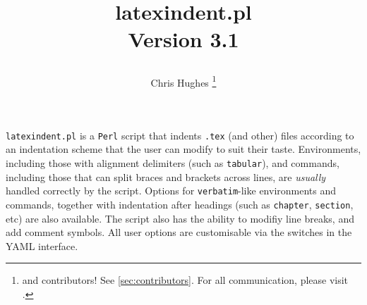 \documentclass[10pt]{article}
\begin{document}
\renewcommand*{\thefootnote}{\arabic{footnote}}
\title{%
	\begin{tcolorbox}[
			width=5.2cm,
			boxrule=0pt,
			colframe=white!40!black,
			colback=white,
			rightrule=2pt,
			sharp corners,
			enhanced,
			overlay={\node[anchor=north east,outer sep=2pt] at ([xshift=3cm,yshift=4mm]frame.north east) {\texttt{[image: logo]}}; }]
		\centering\ttfamily\bfseries latexindent.pl\\[1cm] Version 3.1
	\end{tcolorbox}
}
\author{Chris Hughes \thanks{and contributors! See \vref{sec:contributors}. For
		all communication, please visit \cite{latexindent-home}.}}
\maketitle
\begin{adjustwidth}{1cm}{1cm}
	\small
	\texttt{latexindent.pl} is a \texttt{Perl} script that indents \texttt{.tex} (and other)
	files according to an indentation scheme that the user can modify to suit their
	taste. Environments, including those with alignment delimiters (such as \texttt{tabular}),
	and commands, including those that can split braces and brackets across lines,
	are \emph{usually} handled correctly by the script. Options for \texttt{verbatim}-like
	environments and commands, together with indentation after headings (such as \lstinline!chapter!, \lstinline!section!, etc)
	are also available. The script also has the ability to modifiy line breaks, and add
	comment symbols. All user options are customisable via the switches in the YAML interface.
\end{adjustwidth}
\tableofcontents
{\small
	\lstlistoflistings
}














\stopcontents[noAdditionalIndent]







\end{document}
